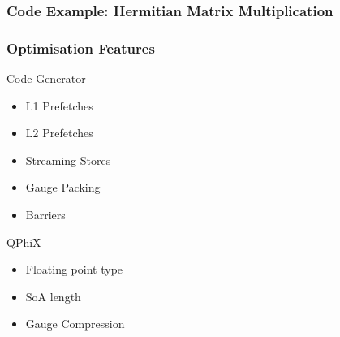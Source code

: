 \documentclass{beamer}
\begin{document}

  \begin{frame}[fragile]
    \frametitle{Code Example: Hermitian Matrix Multiplication}
    \small

    
\end{frame}


  \begin{frame}
    \frametitle{Optimisation Features}


    \begin{block}{Code Generator}
    \begin{itemize}
        \item L1 Prefetches
        \item L2 Prefetches
        \item Streaming Stores
        \item Gauge Packing
        \item Barriers
    \end{itemize}
    \end{block}

    \begin{block}{QPhiX}
    \begin{itemize}
      \item Floating point type
      \item SoA length
      \item Gauge Compression
    \end{itemize}
    \end{block}

  \end{frame}
\end{document}
